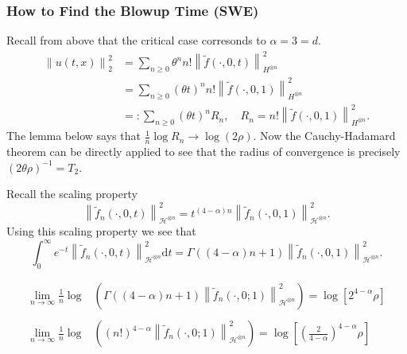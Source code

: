 \documentclass{beamer}%
\numberwithin{equation}{section}
\newcommand{\Norm}[1]{\left\|  #1   \right\|}
\newcommand{\ud}{\ensuremath{\mathrm{d} }}
\begin{document}
		\begin{frame}[t]
		\frametitle{How to Find the Blowup Time (SWE)}
		Recall from above that the critical case corresonds to $\alpha = 3 = d$.
		\begin{align*}
		\Norm{u(t,x)}_2^2 &= \sum_{n \ge 0} \theta^n n! \Norm{\tilde{f}(\cdot,0,t)}_{H^{\otimes n}}^2
		\\&= \sum_{n \ge 0} (\theta t)^n n! \Norm{\tilde{f}(\cdot,0,1)}_{H^{\otimes n}}^2
		\\& =: \sum_{n \ge 0} (\theta t)^n R_n, \quad R_n = n! \Norm{\tilde{f}(\cdot,0,1)}_{H^{\otimes n}}^2.
		\end{align*}
		The lemma below says that $\frac{1}{n}\log{R_n} \to \log(2 \rho)$. Now the Cauchy-Hadamard theorem can be directly applied to see that the radius of convergence is precisely $(2\theta \rho)^{-1} = T_2$.
		
	\end{frame}
	
	\begin{frame}
		Recall the scaling property
		\[
		\Norm{\tilde{f}_n(\cdot,0,t)}_{\mathcal{H}^{\otimes n}}^2 = t^{(4-\alpha)n}\Norm{\tilde{f}_n(\cdot,0,1)}_{\mathcal{H}^{\otimes n}}^2.
		\]
		Using this scaling property we see that
		\[
		\int_0^\infty e^{-t}\Norm{\tilde{f}_n(\cdot,0,t)}_{\mathcal{H}^{\otimes n}}^2  \ud t = \Gamma((4-\alpha)n+1)\Norm{\tilde{f}_n(\cdot,0,1)}_{\mathcal{H}^{\otimes n}}^2.
		\]
		
		\begin{lemma}
			
			\begin{align*}
			\lim_{n \to \infty}\frac{1}{n} \log & \left(\Gamma((4-\alpha)n+1)\Norm{\tilde{f}_n(\cdot,0;1)}_{\mathcal{H}^{\otimes n}}^2\right) = \log\left[ 2^{4-\alpha}\rho \right]
			\\ \\ \lim_{n \to \infty}\frac{1}{n} \log & \left((n!)^{4-\alpha}\Norm{\tilde{f}_n(\cdot,0;1)}_{\mathcal{H}^{\otimes n}}^2\right) = \log\left[ \left(\frac{2}{4-\alpha}\right)^{4-\alpha}\rho \right]
			\end{align*}
		\end{lemma}
	\end{frame}
	
\end{document}
